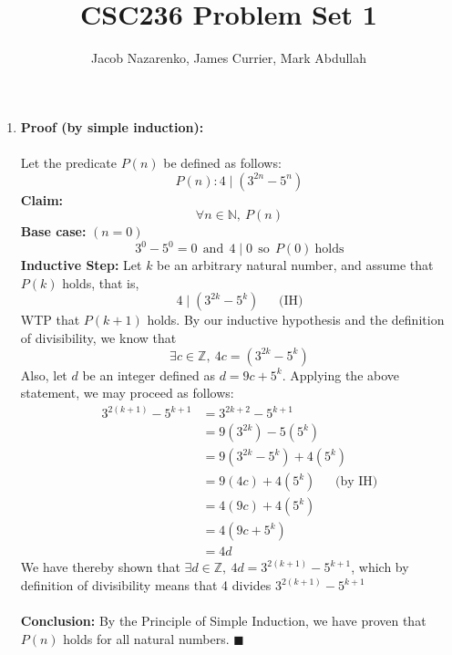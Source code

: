 \documentclass{article}
\title{CSC236 Problem Set 1}
\author{Jacob Nazarenko, James Currier, Mark Abdullah}
\newcommand{\Z}{\mathbb{Z}}
\newcommand{\N}{\mathbb{N}}
\begin{document}
\maketitle
\begin{enumerate}
	
	\item \textbf{Proof (by simple induction):} \\\\
	Let the predicate $P(n)$ be defined as follows: $$P(n): 4 \mid (3^{2n}-5^n)$$
	\textbf{Claim:} $$\forall n \in \N,\ P(n)$$
	\textbf{Base case:} $(n = 0)$ \\ $$3^0 - 5^0 = 0\ \ \textrm{and}\ \ 4 \mid 0\ \ \textrm{so}\ \ P(0)\ \textrm{holds}$$
	\textbf{Inductive Step:} Let $k$ be an arbitrary natural number, and assume that $P(k)$ holds, that is, 
	$$4 \mid (3^{2k}-5^k)\ \ \ \ \ \ \ \textrm{(IH)}$$
	WTP that $P(k+1)$ holds. By our inductive hypothesis and the definition of divisibility, we know that 
	$$\exists c \in \Z,\ 4c = (3^{2k}-5^k)$$
	Also, let $d$ be an integer defined as $d = 9c + 5^k$. Applying the above statement, we may proceed as follows:
	\begin{align*}
		3^{2(k+1)} - 5^{k+1} &= 3^{2k+2} - 5^{k+1} \\
		&= 9(3^{2k}) - 5(5^k) \\
		&= 9(3^{2k}-5^k) + 4(5^k) \\
		&= 9(4c) + 4(5^k) \ \ \ \ \ \ \ \textrm{(by IH)} \\
		&= 4(9c) + 4(5^k) \\
		&= 4(9c + 5^k) \\
		&= 4d
	\end{align*}
	We have thereby shown that $\exists d \in \Z,\ 4d = 3^{2(k+1)} - 5^{k+1}$, which by definition of divisibility means that 4 divides $3^{2(k+1)} - 5^{k+1}$ \\\\
	\textbf{Conclusion:} By the Principle of Simple Induction, we have proven that $P(n)$ holds for all natural numbers. \null\hfill $\blacksquare$ \\
	

\end{enumerate}
\end{document}
